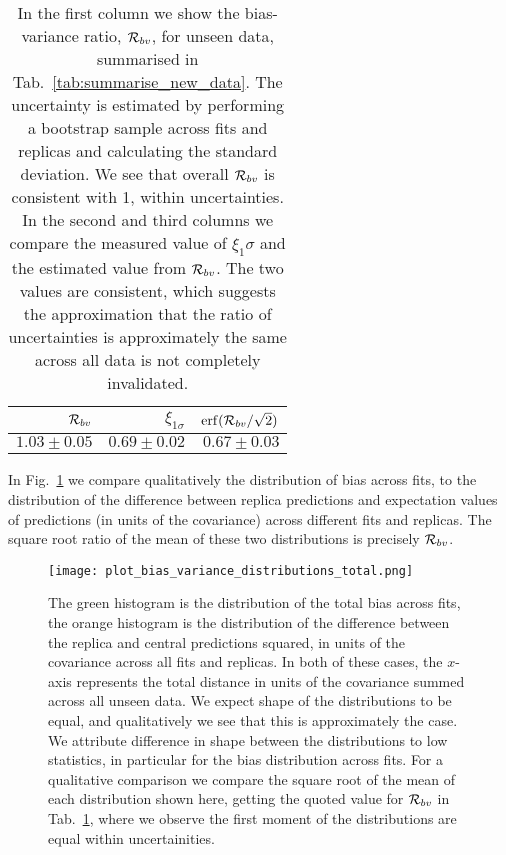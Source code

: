\begin{table}[h]
    \begin{center}
        \setlength{\tabcolsep}{12pt} 
        \begin{tabular}{rrr}
            \toprule
             $\mathcal{R}_{bv}$ & $\xi_{1\sigma}$ & ${\rm erf}(\mathcal{R}_{bv}/\sqrt{2})$ \\
            \midrule
             $1.03\pm0.05$ & $0.69\pm0.02$   & $0.67\pm0.03$                  \\
            \bottomrule
            \end{tabular}
    \end{center}
    \caption{In the first column we show the bias-variance ratio,
        $\mathcal{R}_{bv}$, for unseen data, summarised in
        Tab.~\ref{tab:summarise_new_data}. The uncertainty is estimated by
        performing a bootstrap sample across fits and replicas and calculating
        the standard deviation. We see that overall $\mathcal{R}_{bv}$ is
        consistent with 1, within uncertainties. In the second and third
        columns we compare the measured value of $\xi_1\sigma$ and the estimated
        value from $\mathcal{R}_{bv}$. The two values are consistent, which
        suggests the approximation that the ratio of uncertainties is
        approximately the same across all data is not completely invalidated.}
    \label{tab:biasvarratio}
\end{table}

In Fig.~\ref{eq:bias_varinace_distributions} we compare qualitatively the
distribution of bias across fits, to the distribution of the difference between
replica predictions and expectation values of predictions (in units of the
covariance) across different fits and replicas. The square root ratio of the
mean of these two distributions is precisely $\mathcal{R}_{bv}$.

\begin{figure}[h]
    \centering
    \texttt{[image: plot\_bias\_variance\_distributions\_total.png]}
    \caption{The green histogram is the distribution of the total bias across
    fits, the orange histogram is the distribution of the difference between the
    replica and central predictions squared, in units of the covariance across
    all fits and replicas. In both of these cases, the $x$-axis represents the
    total distance in units of the covariance summed
    across all unseen data. We expect
    shape of the distributions to be equal, and qualitatively we see that this
    is approximately the case. We attribute difference in shape between the
    distributions to low statistics, in particular for the bias
    distribution across fits. For a qualitative
    comparison we compare the square root of
    the mean of each distribution shown here, getting the quoted value for
    $\mathcal{R}_{bv}$ in Tab.~\ref{tab:biasvarratio}, where we observe the first
    moment of the distributions are equal within uncertainities.
    }
    \label{eq:bias_varinace_distributions}
\end{figure}

